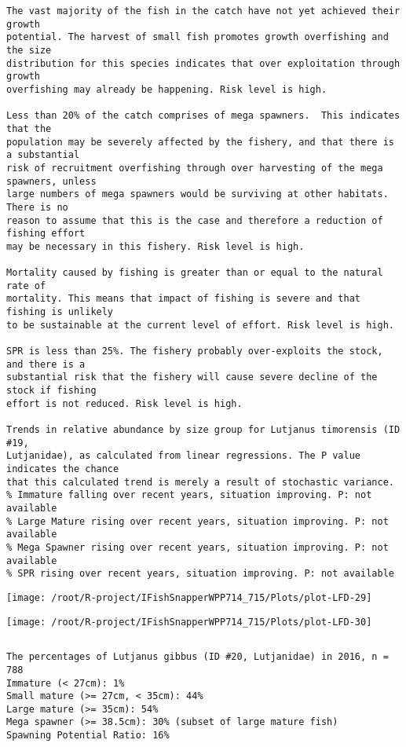 \documentclass{report}\usepackage[]{graphicx}\usepackage[]{color}
\makeatletter
\def\maxwidth{ %
  \ifdim\Gin@nat@width>\linewidth
    \linewidth
  \else
    \Gin@nat@width
  \fi
}
\newenvironment{kframe}{%
 \def\at@end@of@kframe{}%
 \ifinner\ifhmode%
  \def\at@end@of@kframe{\end{minipage}}%
  \begin{minipage}{\columnwidth}%
 \fi\fi%
 \def\FrameCommand##1{\hskip\@totalleftmargin \hskip-\fboxsep
 \colorbox{shadecolor}{##1}\hskip-\fboxsep
     \hskip-\linewidth \hskip-\@totalleftmargin \hskip\columnwidth}%
 \MakeFramed {\advance\hsize-\width
   \@totalleftmargin\z@ \linewidth\hsize
   \@setminipage}}%
 {\par\unskip\endMakeFramed%
 \at@end@of@kframe}
\newenvironment{knitrout}{}{} %
\makeatother
\begin{document}
\begin{knitrout}
\begin{kframe}
\begin{verbatim}
The vast majority of the fish in the catch have not yet achieved their growth
potential. The harvest of small fish promotes growth overfishing and the size
distribution for this species indicates that over exploitation through growth
overfishing may already be happening. Risk level is high.

Less than 20% of the catch comprises of mega spawners.  This indicates that the
population may be severely affected by the fishery, and that there is a substantial
risk of recruitment overfishing through over harvesting of the mega spawners, unless
large numbers of mega spawners would be surviving at other habitats. There is no
reason to assume that this is the case and therefore a reduction of fishing effort
may be necessary in this fishery. Risk level is high.
 
Mortality caused by fishing is greater than or equal to the natural rate of
mortality. This means that impact of fishing is severe and that fishing is unlikely
to be sustainable at the current level of effort. Risk level is high.
 
SPR is less than 25%. The fishery probably over-exploits the stock, and there is a
substantial risk that the fishery will cause severe decline of the stock if fishing
effort is not reduced. Risk level is high.
 
Trends in relative abundance by size group for Lutjanus timorensis (ID #19,
Lutjanidae), as calculated from linear regressions. The P value indicates the chance
that this calculated trend is merely a result of stochastic variance.
% Immature falling over recent years, situation improving. P: not available
% Large Mature rising over recent years, situation improving. P: not available
% Mega Spawner rising over recent years, situation improving. P: not available
% SPR rising over recent years, situation improving. P: not available
\end{verbatim}
\end{kframe}
\texttt{[image: /root/R-project/IFishSnapperWPP714\_715/Plots/plot-LFD-29]} 

\texttt{[image: /root/R-project/IFishSnapperWPP714\_715/Plots/plot-LFD-30]} 
\begin{kframe}\begin{verbatim}
\end{verbatim}
\end{kframe}
\clearpage
\newpage
\begin{kframe}\begin{verbatim}The percentages of Lutjanus gibbus (ID #20, Lutjanidae) in 2016, n = 788
Immature (< 27cm): 1%
Small mature (>= 27cm, < 35cm): 44%
Large mature (>= 35cm): 54%
Mega spawner (>= 38.5cm): 30% (subset of large mature fish)
Spawning Potential Ratio: 16%
 

\end{verbatim}
\end{kframe}
\end{knitrout}
\end{document}
